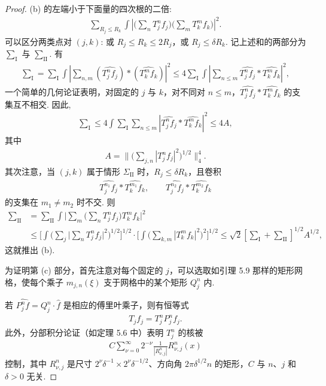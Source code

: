 \begin{proof}
(b) 的左端小于下面量的四次根的二倍:
\begin{align*}
  \sum_{R_{j}\leq R_{k}}\int\left|\Big(\sum_{n}T_{j}^{n} f_{j}\Big)\Big(\sum_{m}T_{k}^{m} f_{k}\Big)\right|^{2}.
\end{align*}
可以区分两类点对 $(j, k)$: 或 $R_j \leq R_k \leq 2R_j$，或 $R_j \leq \delta R_k$. 记上述和的两部分为 $\sum_{\mathrm{I}}$ 与 $\sum_{\mathrm{II}}$. 有
\begin{align*}
  \sum_{\mathrm{I}}
  =\sum_{\mathrm{I}}\int\left|\sum_{n,m}(\widehat{T_{j}^{n}f_{j}})\ast(\widehat{T_{k}^{m}f_{k}})\right|^{2}
  \leq 4\sum_{\mathrm{I}}\int\left|\sum_{n\leq m}\widehat{T_{j}^{n}f_{j}}\ast\widehat{T_{k}^{m}f_{k}}\right|^{2},
\end{align*}
一个简单的几何论证表明，对固定的 $j$ 与 $k$，对不同对 $n \leq m$，$\widehat{T_{j}^{n} f_{j}} * \widehat{T_{k}^{m} f_{k}}$ 的支集互不相交. 因此,
\begin{align*}
  \sum_{\mathrm{I}}\leq 4\int\sum_{\mathrm{I}}\sum_{n\leq m}|\widehat{T_{j}^{n}f_{j}}*\widehat{T_{k}^{m}f_{k}}|^{2}\leq 4A,
\end{align*}
其中
\begin{align*}
  A=\Big\|\Big(\sum_{j,n}|T_{j}^{n} f_{j}|^{2}\Big)^{1/2}\Big\|_{4}^{4}.
\end{align*}
其次注意，当 $(j,k)$ 属于情形 $\Sigma_{\mathrm{II}}$ 时，$R_{j} \leq \delta R_{k}$，且卷积
\begin{align*}
  \widehat{T_{j}^{n_{1}}f_{j}}*\widehat{T_{k}^{m_{1}}f_{k}},\qquad
  \widehat{T_{j}^{n_{2}}f_{j}}*\widehat{T_{k}^{m_{2}}f_{k}}
\end{align*}
的支集在 $m_1 \neq m_2$ 时不交. 则
\begin{align*}
  \sum_{\mathrm{II}}
  &=\sum_{\mathrm{II}}\int\Big|\sum_{m}\Big(\sum_{n}T_{j}^{n}f_{j}\Big)T_{k}^{m}f_{k}\Big|^{2}\\
  &\leq\Big[\int\Big(\sum_{j}\Big|\sum_{n}T_{j}^{n}f_{j}\Big|^{2}\Big)^{1/2}\Big]^{1/2}
   \cdot\Big[\int\Big(\sum_{k,m}|T_{k}^{m}f_{k}|^{2}\Big)^{2}\Big]^{1/2}
  \leq\sqrt{2}\left[\sum_{\mathrm{I}}+\sum_{\mathrm{II}}\right]^{1/2}A^{1/2},
\end{align*}
这就推出 (b).

为证明第 (c) 部分，首先注意对每个固定的 $j$，可以选取如引理 5.9 那样的矩形网格，使每个乘子 $m_{j,n}(\xi)$ 支于网格中的某个矩形 $Q_{j}^{n}$ 内.

若 $\widehat{P_j^n f} = Q_j^n\cdot\widehat{f}$ 是相应的傅里叶乘子，则有恒等式
\begin{align*}
  T_{j}f_{j}=T_{j}^{n}P_{j}^{n}f_{j}.
\end{align*}
此外，分部积分论证（如定理 5.6 中）表明 $T_j^n$ 的核被
\begin{align*}
  C\sum_{\nu=0}^{\infty}2^{-\nu}\frac{1}{|R_{\nu,j}^{n}|}R_{\nu,j}^{n}(x)
\end{align*}
控制，其中 $R_{\nu,j}^n$ 是尺寸 $2^\nu\delta^{-1} \times 2^\nu\delta^{-1/2}$、方向角 $2\pi\delta^{1/2}n$ 的矩形，$C$ 与 $n$、$j$ 和 $\delta > 0$ 无关.


\end{proof}
